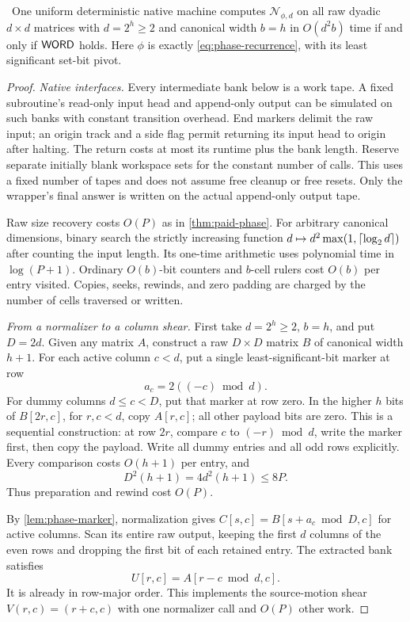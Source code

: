 \begin{theorem}\label{thm:normalizer-word}
\notformalized\ One uniform deterministic native machine computes
$\mathcal N_{\phi,d}$ on all raw dyadic $d\times d$ matrices with
$d=2^h\ge2$ and canonical width $b=h$ in $O(d^2b)$ time if and
only if $\mathsf{WORD}$ holds. Here $\phi$ is exactly
\cref{eq:phase-recurrence}, with its least significant set-bit pivot.
\end{theorem}
\begin{proof}
\emph{Native interfaces.}
Every intermediate bank below is a work tape. A fixed subroutine's
read-only input head and append-only output can be simulated on such
banks with constant transition overhead. End markers delimit the raw
input; an origin track and a side flag permit returning its input head
to origin after halting. The return costs at most its runtime plus the
bank length. Reserve separate initially blank workspace sets for the
constant number of calls. This uses a fixed number of tapes and does
not assume free cleanup or free resets. Only the wrapper's final answer
is written on the actual append-only output tape.

Raw size recovery costs $O(P)$ as in \cref{thm:paid-phase}.
For arbitrary canonical dimensions, binary search the strictly increasing
function $d\mapsto d^2\max(1,\left\lceil \log_2d\right\rceil)$ after counting the input
length. Its one-time arithmetic uses polynomial time in $\log(P+1)$.
Ordinary $O(b)$-bit counters and $b$-cell rulers cost $O(b)$ per
entry visited. Copies, seeks, rewinds, and zero padding are charged by
the number of cells traversed or written.

\emph{From a normalizer to a column shear.}
First take $d=2^h\ge2$, $b=h$, and put $D=2d$. Given any matrix
$A$, construct a raw $D\times D$ matrix $B$ of canonical width $h+1$.
For each active column $c<d$, put a single least-significant-bit marker
at row
\[
 a_c=2((-c)\bmod d).
\]
For dummy columns $d\le c<D$, put that marker at row zero. In the
higher $h$ bits of $B[2r,c]$, for $r,c<d$, copy $A[r,c]$; all
other payload bits are zero. This is a sequential construction: at row
$2r$, compare $c$ to $(-r)\bmod d$, write the marker first, then
copy the payload. Write all dummy entries and all odd rows explicitly.
Every comparison costs $O(h+1)$ per entry, and
\[
 D^2(h+1)=4d^2(h+1)\le8P.
\]
Thus preparation and rewind cost $O(P)$.

By \cref{lem:phase-marker}, normalization gives
$C[s,c]=B[s+a_c\bmod D,c]$ for active columns. Scan its entire raw
output, keeping the first $d$ columns of the even rows and dropping
the first bit of each retained entry. The extracted bank satisfies
\[
 U[r,c]=A[r-c\bmod d,c].
\]
It is already in row-major order. This implements the source-motion
shear $V(r,c)=(r+c,c)$ with one normalizer call and $O(P)$ other work.


\end{proof}
